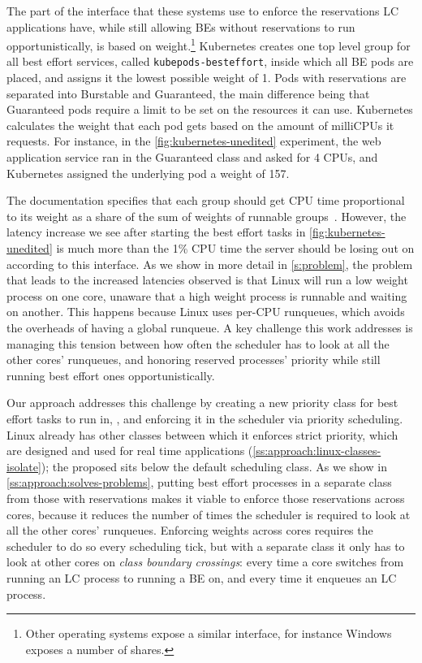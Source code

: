 The part of the \cgroups{} interface that these systems use to enforce the
reservations LC applications have, while still allowing BEs without reservations
to run opportunistically, is based on weight.\footnote{Other operating systems
expose a similar interface, for instance Windows exposes a number of shares.}
Kubernetes creates one top level group for all best effort services, called
\texttt{kubepods-besteffort}, inside which all BE pods are placed, and assigns
it the lowest possible weight of 1. Pods with reservations are separated into
Burstable and Guaranteed, the main difference being that Guaranteed pods require
a limit to be set on the resources it can use. Kubernetes calculates the weight
that each pod gets based on the amount of milliCPUs it requests. For instance,
in the \autoref{fig:kubernetes-unedited} experiment, the web application service
ran in the Guaranteed class and asked for 4 CPUs, and Kubernetes assigned the
underlying pod a weight of 157.

The \cgroups{} documentation specifies that each group should get CPU time
proportional to its weight as a share of the sum of weights of runnable
groups~\cite{cgroups-kerneldocs}. However, the latency increase we see after
starting the best effort tasks in \autoref{fig:kubernetes-unedited} is much more
than the 1\% CPU time the server should be losing out on according to this
interface. As we show in more detail in \autoref{s:problem}, the problem that
leads to the increased latencies observed is that Linux will run a low weight
process on one core, unaware that a high weight process is runnable and waiting
on another. This happens because Linux uses per-CPU runqueues, which avoids the
overheads of having a global runqueue. A key challenge this work addresses is
managing this tension between how often the scheduler has to look at all the
other cores' runqueues, and honoring reserved processes' priority while still
running best effort ones opportunistically.

Our approach addresses this challenge by creating a new priority class for best
effort tasks to run in, \beclass{}, and enforcing it in the scheduler via
priority scheduling. Linux already has other classes between which it enforces
strict priority, which are designed and used for real time applications
(\autoref{ss:approach:linux-classes-isolate}); the proposed \beclass{} sits
below the default scheduling class. As we show in
\autoref{ss:approach:solves-problems}, putting best effort processes in a
separate class from those with reservations makes it viable to enforce those
reservations across cores, because it reduces the number of times the scheduler
is required to look at all the other cores' runqueues. Enforcing weights across
cores requires the scheduler to do so every scheduling tick, but with a separate
class it only has to look at other cores on \textit{class boundary crossings}:
every time a core switches from running an LC process to running a BE on, and
every time it enqueues an LC process.

